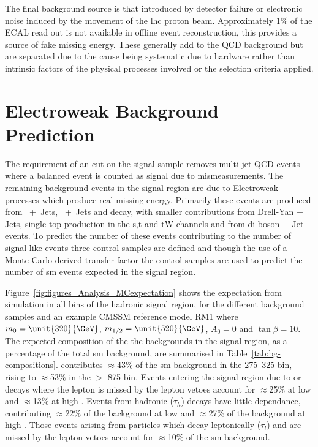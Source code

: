 The final background source is that introduced by detector failure or 
electronic noise induced by the movement of the \ac{lhc} proton beam.
Approximately 1$\%$ of the ECAL read out is not available in offline event 
reconstruction, this provides a source of fake missing energy. These generally add to the QCD background but are separated due to the cause being systematic due to hardware rather than intrinsic factors of the physical processes involved or the selection criteria applied.



\section{Electroweak Background Prediction} %
\label{sec:electro_weak_background_prediciton}

The requirement of an \alt cut on the signal sample removes multi-jet QCD 
events where a balanced event is counted as signal due to mismeasurements. 
The remaining background events in the signal region are due to Electroweak 
processes which produce real missing energy. Primarily these events are 
produced from \HepProcess{\PZ\to\Pnu\APnu}~+~Jets, 
\HepProcess{\PW\to\Pl\APnu}~+~Jets and \HepProcess{\Ptop\APtop} decay, with 
smaller contributions from Drell-Yan + Jets, single top production in the s,t 
and tW channels and from di-boson + Jet events. To predict the number of these 
events contributing to the number of signal like events three control samples 
are defined and though the use of a Monte Carlo derived transfer factor the 
control samples are used to predict the number of \ac{sm} events expected in 
the signal region.


Figure~\ref{fig:figures_Analysis_MCexpectation}\cite{CMS-AN-11-517} shows the 
expectation from simulation in all bins of the hadronic signal region, for the 
different background samples and an example CMSSM reference model RM1 where $m_0=\unit{320}{\GeV}$, $m_{1/2}=\unit{520}{\GeV}$, $A_0=0$ and $\tan\beta=10$. 
The expected composition of the the backgrounds in the signal region, 
as a percentage of the total \ac{sm} background, are summarised in 
Table~\ref{tab:bg-compositions}. \HepProcess{\PZ\to\nu\nu} contributes 
$\approx$43$\%$ of the \ac{sm} background in the 
\unit{275}{\GeV}--\unit{325}{\GeV} \HT bin, rising to $\approx$53$\%$ in the 
\HT $>$ \unit{875}{\GeV} bin. Events entering the signal region due to \PZ or 
\PW decays where the lepton is missed by the lepton vetoes account for 
$\approx$25$\%$ at low \HT and $\approx$13$\%$ at high \HT. Events from 
hadronic \Ptau ($\tau_{h}$) decays have little \HT dependance, contributing 
$\approx$22$\%$ of the background at low \HT and $\approx$27$\%$ of the 
background at high \HT. Those events arising from \Ptau particles which decay leptonically ($\tau_{l}$) and are missed by the lepton vetoes account for $\approx$10$\%$ of the \ac{sm} background.

